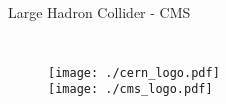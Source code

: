 \documentclass{beamer}
\begin{document}
\begin{frame}{Large Hadron Collider - CMS}
  \begin{columns}
      \begin{figure}
        \centering
        \texttt{[image: ./cern\_logo.pdf]}\\
        \vspace{1ex}
        \texttt{[image: ./cms\_logo.pdf]}
      \end{figure}
      \begin{figure}
        
      \end{figure}
      \begin{flushright}
        \vspace{-2ex}
        \scalebox{.4}{
          Image adapted from https://cds.cern.ch/record/2665537
        }
      \end{flushright}
    \end{columns}
%
\end{frame}
\end{document}
